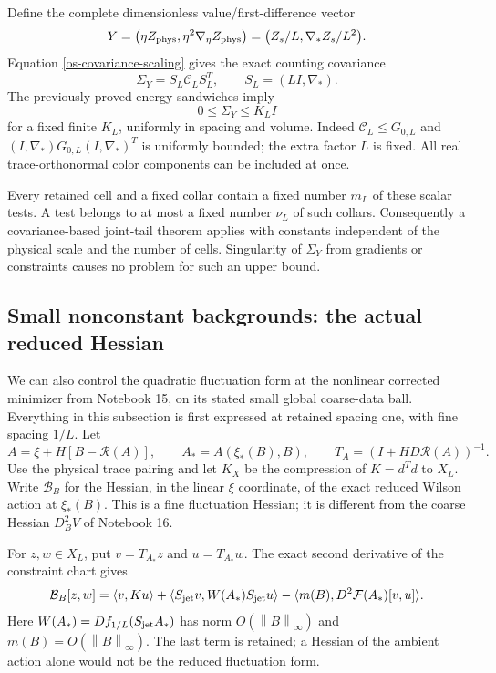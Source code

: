 \documentclass[11pt]{article}
\theoremstyle{remark}
\newcommand{\norm}[1]{\left\|#1\right\|}
\begin{document}
Define the complete dimensionless value/first-difference vector
\begin{equation}\label{os-microscopic-field}
 Y=\bigl(\eta Z_{\rm phys},\eta^2\nabla_\eta Z_{\rm phys}\bigr)
   =\bigl(Z_s/L,\nabla_*Z_s/L^2\bigr).
\end{equation}
Equation \eqref{os-covariance-scaling} gives the exact counting
covariance
\begin{equation}\label{os-Y-covariance}
 \Sigma_Y=S_L\mathcal C_LS_L^T,
       \qquad S_L=(LI,\nabla_*).
\end{equation}
The previously proved energy sandwiches imply
\begin{equation}\label{os-uniform-covariance}
 0\le\Sigma_Y\le K_L I
\end{equation}
for a fixed finite $K_L$, uniformly in spacing and volume.
Indeed $\mathcal C_L\le G_{0,L}$ and
$(I,\nabla_*)G_{0,L}(I,\nabla_*)^T$ is uniformly bounded;
the extra factor $L$ is fixed. All real trace-orthonormal
color components can be included at once.

Every retained cell and a fixed collar contain a fixed number
$m_L$ of these scalar tests. A test belongs to at most a fixed
number $\nu_L$ of such collars. Consequently a covariance-based
joint-tail theorem applies with constants independent of the
physical scale and the number of cells. Singularity of
$\Sigma_Y$ from gradients or constraints causes no problem for
such an upper bound.

\subsection{Small nonconstant backgrounds: the actual reduced Hessian}
\label{os-nonflat}

We can also control the quadratic fluctuation form at the
nonlinear corrected minimizer from Notebook 15, on its stated
small global coarse-data ball. Everything in this subsection
is first expressed at retained spacing one, with fine spacing
$1/L$. Let
\[
 A=\xi+H[B-\mathcal R(A)],\qquad
 A_*=A(\xi_*(B),B),\qquad
 T_A=(I+HD\mathcal R(A))^{-1}.
\]
Use the physical trace pairing and let $K_X$ be the compression
of $K=d^Td$ to $X_L$. Write $\mathcal B_B$ for the Hessian,
in the linear $\xi$ coordinate, of the exact reduced Wilson
action at $\xi_*(B)$. This is a fine fluctuation Hessian;
it is different from the coarse Hessian $D_B^2V$ of Notebook 16.

For $z,w\in X_L$, put $v=T_{A_*}z$ and $u=T_{A_*}w$.
The exact second derivative of the constraint chart gives
\begin{equation}\label{os-reduced-form}
 \mathcal B_B[z,w]
  =\langle v,K u\rangle
   +\langle S_{\rm jet}v,W(A_*)S_{\rm jet}u\rangle
   -\langle m(B),D^2\mathcal F(A_*)[v,u]\rangle.
\end{equation}
Here $W(A_*)=Df_{1/L}(S_{\rm jet}A_*)$ has norm
$O(\norm{B}_\infty)$ and $m(B)=O(\norm{B}_\infty)$.
The last term is retained; a Hessian of the ambient action
alone would not be the reduced fluctuation form.
\end{document}
